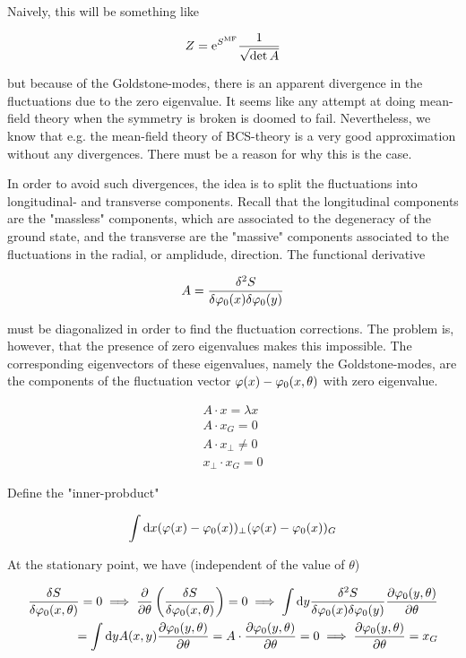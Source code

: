 Naively, this will be something like 

\begin{align*}
    Z = \mathrm{e}^{S^{\text{MF}}} \frac{1}{\sqrt{\det A}}
\end{align*}

but because of the Goldstone-modes, there is an apparent divergence in the fluctuations due to the zero eigenvalue. It seems like any attempt at doing mean-field theory when the symmetry is broken is doomed to fail. Nevertheless, we know that e.g. the mean-field theory of BCS-theory is a very good approximation without any divergences. There must be a reason for why this is the case.  

In order to avoid such divergences, the idea is to split the fluctuations into longitudinal- and transverse components. Recall that the longitudinal components are the "massless" components, which are associated to the degeneracy of the ground state, and the transverse are the "massive" components associated to the fluctuations in the radial, or amplidude, direction. The functional derivative 

\begin{equation*}
    A = \fdv{^2S}{\p_0(x) \delta \p_0(y)}
\end{equation*}

must be diagonalized in order to find the fluctuation corrections. The problem is, however, that the presence of zero eigenvalues makes this impossible. The corresponding eigenvectors of these eigenvalues, namely the Goldstone-modes, are the components of the fluctuation vector $\varphi(x) - \varphi_0(x,\theta)$ with zero eigenvalue.  

\begin{align*}
    A \cdot x = \lambda x \\ 
    A \cdot x_G = 0 \\ 
    A \cdot x_{\perp} \neq 0 \\ 
    x_{\perp} \cdot x_G = 0
\end{align*}

Define the "inner-probduct" 

\begin{align*}
    \int \dd x (\varphi(x) - \varphi_0(x))_{\perp} (\varphi(x) - \varphi_0(x))_G
\end{align*}

At the stationary point, we have (independent of the value of $\theta$) 

\begin{align*}
    \fdv{S}{\p_0(x,\theta)} = 0 \implies \pdv{}{\theta} \left(\fdv{S}{\p_0(x,\theta)}  \right) = 0 
    \implies \int \dd y \fdv{^2S}{\p_0(x) \delta \p_0(y)} \pdv{\p_0(y,\theta)}{\theta} \\ 
    = \int \dd y A(x,y)\pdv{\p_0(y,\theta)}{\theta} = A \cdot \pdv{\p_0(y,\theta)}{\theta} = 0 
    \implies \pdv{\p_0(y,\theta)}{\theta} = x_G
\end{align*}

